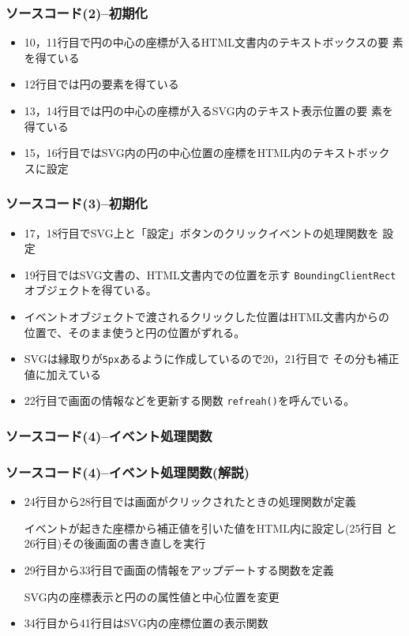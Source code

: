 \begin{frame}[containsverbatim]
 \frametitle{ソースコード(2)--初期化}
 \begin{itemize}
	\item 10，11行目で円の中心の座標が入るHTML文書内のテキストボックスの要
				素を得ている
	\item 12行目では円の要素を得ている
	\item 13，14行目では円の中心の座標が入るSVG内のテキスト表示位置の要
				素を得ている
	\item 15，16行目ではSVG内の円の中心位置の座標をHTML内のテキストボック
				スに設定
 \end{itemize}
\end{frame}
\begin{frame}[containsverbatim]
 \frametitle{ソースコード(3)--初期化}
 \begin{itemize}
	\item 17，18行目でSVG上と「設定」ボタンのクリックイベントの処理関数を
        設定
	\item 19行目ではSVG文書の、HTML文書内での位置を示す
				\texttt{BoundingClientRect}オブジェクトを得ている。
	\item イベントオブジェクトで渡されるクリックした位置はHTML文書内からの
        位置で、そのまま使うと円の位置がずれる。
	\item SVGは縁取りが\texttt{5px}あるように作成しているので20，21行目で
				その分も補正値に加えている
	\item 22行目で画面の情報などを更新する関数
				\texttt{refreah()}を呼んでいる。
 \end{itemize}
\end{frame}
\begin{frame}[containsverbatim]
 \frametitle{ソースコード(4)--イベント処理関数}
\end{frame}
\begin{frame}[containsverbatim]
 \frametitle{ソースコード(4)--イベント処理関数(解説)}
\begin{itemize}
	\item 24行目から28行目では画面がクリックされたときの処理関数が定義

				イベントが起きた座標から補正値を引いた値をHTML内に設定し(25行目
				と26行目)その後画面の書き直しを実行
	\item 29行目から33行目で画面の情報をアップデートする関数を定義

				SVG内の座標表示と円のの属性値と中心位置を変更
	\item 34行目から41行目はSVG内の座標位置の表示関数
 \end{itemize}
\end{frame}
